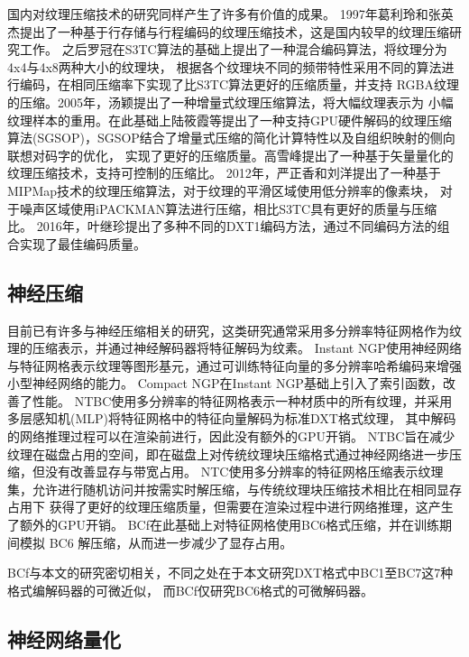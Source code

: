 国内对纹理压缩技术的研究同样产生了许多有价值的成果。
1997年葛利玲和张英杰\cite{JSGG712.006}提出了一种基于行存储与行程编码的纹理压缩技术，这是国内较早的纹理压缩研究工作。
之后罗冠\cite{2001008022.nh}在S3TC算法的基础上提出了一种混合编码算法，将纹理分为4x4与4x8两种大小的纹理块，
根据各个纹理块不同的频带特性采用不同的算法进行编码，在相同压缩率下实现了比S3TC算法更好的压缩质量，并支持
RGBA纹理的压缩。2005年，汤颖\cite{2005044039.nh}提出了一种增量式纹理压缩算法，将大幅纹理表示为
小幅纹理样本的重用。在此基础上陆筱霞等\cite{XTFZ2009S1011}提出了一种支持GPU硬件解码的纹理压缩算法(SGSOP)，SGSOP结合了增量式压缩的简化计算特性以及自组织映射的侧向联想对码字的优化，
实现了更好的压缩质量。高雪峰\cite{2005064449.nh}提出了一种基于矢量量化的纹理压缩技术，支持可控制的压缩比。
2012年，严正香和刘洋\cite{XYNG201201041}提出了一种基于MIPMap技术的纹理压缩算法，对于纹理的平滑区域使用低分辨率的像素块，
对于噪声区域使用iPACKMAN算法进行压缩，相比S3TC具有更好的质量与压缩比。
2016年，叶继珍\cite{1016164136.nh}提出了多种不同的DXT1编码方法，通过不同编码方法的组合实现了最佳编码质量。

\subsection{神经压缩}

目前已有许多与神经压缩相关的研究，这类研究通常采用多分辨率特征网格作为纹理的压缩表示，并通过神经解码器将特征解码为纹素。
Instant NGP\cite{muller2022instant}使用神经网络与特征网格表示纹理等图形基元，通过可训练特征向量的多分辨率哈希编码来增强小型神经网络的能力。
Compact NGP\cite{takikawa2023compact}在Instant NGP基础上引入了索引函数，改善了性能。
NTBC\cite{fujieda2024neural}使用多分辨率的特征网格表示一种材质中的所有纹理，并采用多层感知机(MLP)将特征网格中的特征向量解码为标准DXT格式纹理，
其中解码的网络推理过程可以在渲染前进行，因此没有额外的GPU开销。
NTBC旨在减少纹理在磁盘占用的空间，即在磁盘上对传统纹理块压缩格式通过神经网络进一步压缩，但没有改善显存与带宽占用。
NTC\cite{vaidyanathan2023random}使用多分辨率的特征网格压缩表示纹理集，允许进行随机访问并按需实时解压缩，与传统纹理块压缩技术相比在相同显存占用下
获得了更好的纹理压缩质量，但需要在渲染过程中进行网络推理，这产生了额外的GPU开销。
BCf\cite{weinreich2024real}在此基础上对特征网格使用BC6格式压缩，并在训练期间模拟 BC6 解压缩，从而进一步减少了显存占用。

BCf\cite{weinreich2024real}与本文的研究密切相关，不同之处在于本文研究DXT格式中BC1至BC7这7种格式编解码器的可微近似，
而BCf\cite{weinreich2024real}仅研究BC6格式的可微解码器。

\subsection{神经网络量化}



